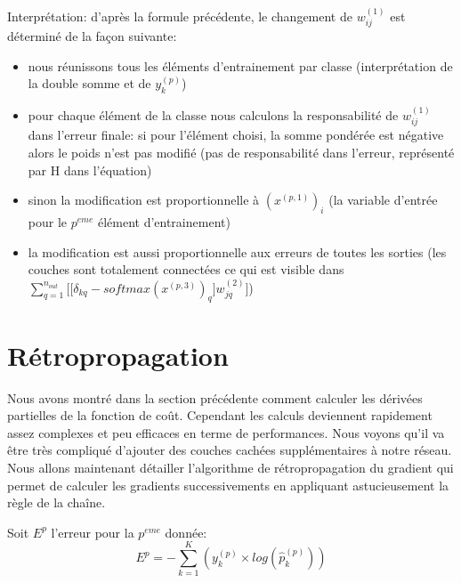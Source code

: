 \documentclass[a4paper,11pt,oneside,roman]{article}
\begin{document}
    Interprétation:
    d'après la formule précédente, le changement de $w_{ij}^{(1)}$ est déterminé de la façon suivante:
    \begin{itemize}
        \item nous réunissons tous les éléments d'entrainement par classe (interprétation de la double somme et de $y_k^{(p)}$)
        \item pour chaque élément de la classe nous calculons la responsabilité de $w_{ij}^{(1)}$ dans l'erreur finale: si pour l'élément choisi, la somme pondérée est négative alors le poids n'est pas modifié (pas de responsabilité dans l'erreur, représenté par H dans l'équation)
        \item sinon la modification est proportionnelle à $(x^{(p,1)})_i$ (la variable d'entrée pour le $p^{eme}$ élément d'entrainement) 
        \item la modification est aussi proportionnelle aux erreurs de toutes les sorties (les couches sont totalement connectées ce qui est visible dans $\sum\limits_{q=1}^{n_{out}} \bigg[ \big[ \delta_{kq} - softmax(x^{(p,3)})_q \big] w_{jq}^{(2)} \bigg]$)
    \end{itemize}

    \section{Rétropropagation}

    Nous avons montré dans la section précédente comment calculer les dérivées partielles de la fonction de coût. Cependant les calculs deviennent rapidement assez complexes et peu efficaces en terme de performances.
    Nous voyons qu'il va être très compliqué d'ajouter des couches cachées supplémentaires à notre réseau.
    Nous allons maintenant détailler l'algorithme de rétropropagation du gradient qui permet de calculer les gradients successivements en appliquant astucieusement la règle de la chaîne.

    Soit $E^p$ l'erreur pour la $p^{eme}$ donnée:
    \begin{equation}
        E^p = - \sum\limits_{k=1}^K (y_{k}^{(p)} \times log(\hat{p}_{k}^{(p)}))
    \end{equation}
\end{document}
